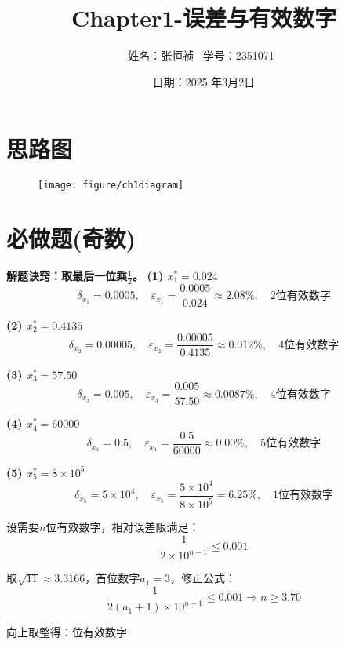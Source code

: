 \documentclass[UTF8]{ctexart}
\title{\textbf{Chapter1-误差与有效数字}}
\author{姓名：张恒祯 \, 学号：2351071 \,}
\date{日期：2025 年3月2日}
\begin{document}
	\maketitle
\section{思路图}
\begin{figure}[htbp]
	\centering
	\texttt{[image: figure/ch1diagram]}
	\label{fig:ch1diagram}
\end{figure}

	\section{必做题(奇数)}	
\begin{tcolorbox}[colback=blue!5!white,colframe=blue!75!black,title=1 近似值误差分析]
	\setcounter{equation}{0}
	\textbf{解题诀窍：取最后一位乘$\frac{1}{2}$。}
	\textbf{(1) $x_1^* = 0.024$}
	\begin{equation}
	\delta_{x_1} = 0.0005,\quad \varepsilon_{x_1} = \frac{0.0005}{0.024} \approx 2.08\%,\quad \text{2位有效数字}
	\end{equation}
	
	\textbf{(2) $x_2^* = 0.4135$}
	\begin{equation}
	\delta_{x_2} = 0.00005,\quad \varepsilon_{x_2} = \frac{0.00005}{0.4135} \approx 0.012\%,\quad \text{4位有效数字}
	\end{equation}
	
	\textbf{(3) $x_3^* = 57.50$}
	\begin{equation}
	\delta_{x_3} = 0.005,\quad \varepsilon_{x_3} = \frac{0.005}{57.50} \approx 0.0087\%,\quad \text{4位有效数字}
	\end{equation}
	
	\textbf{(4) $x_4^* = 60000$}
	\begin{equation}
	\delta_{x_4} = 0.5,\quad \varepsilon_{x_4} = \frac{0.5}{60000} \approx 0.00\%,\quad \text{5位有效数字}
	\end{equation}
	
	\textbf{(5) $x_5^* = 8 \times 10^5$}
	\begin{equation}
	\delta_{x_5} = 5 \times 10^4,\quad \varepsilon_{x_5} = \frac{5 \times 10^4}{8 \times 10^5} = 6.25\%,\quad \text{1位有效数字}
	\end{equation}
\end{tcolorbox}

\begin{tcolorbox}[colback=blue!5!white,colframe=blue!75!black,title=3 $\sqrt{11}$的有效数字分析]
	设需要$n$位有效数字，相对误差限满足：
	\begin{equation}
	\frac{1}{2 \times 10^{n-1}} \leq 0.001
	\end{equation}
	
	取$\sqrt{11} \approx 3.3166$，首位数字$a_1=3$，修正公式：
	\begin{equation}
	\frac{1}{2(a_1+1) \times 10^{n-1}} \leq 0.001 \Rightarrow n \geq 3.70
	\end{equation}
	
	向上取整得：位有效数字
\end{tcolorbox}
\end{document}
